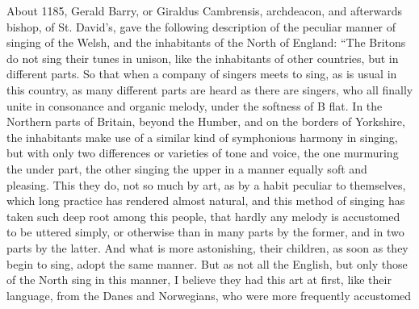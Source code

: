 About 1185, Gerald Barry, or Giraldus Cambrensis, 
\pagebreak
archdeacon, and afterwards
bishop, of St. David’s, gave the following description of the peculiar manner 
of singing of the Welsh, and the inhabitants of the North of England: “The
Britons do not sing their tunes in unison, like the inhabitants of other countries,
but in different parts. So that when a company of singers meets to sing, as is
usual in this country, as many different parts are heard as there are singers, who
all finally unite in consonance and organic melody, under the softness of B flat.
In the Northern parts of Britain, beyond the Humber, and on the borders of
Yorkshire, the inhabitants make use of a similar kind of symphonious harmony
in singing, but with only two differences or varieties of tone and voice, the one
murmuring the under part, the other singing the upper in a manner equally soft
and pleasing. This they do, not so much by art, as by a habit peculiar to themselves,
which long practice has rendered almost natural, and this method of singing
has taken such deep root among this people, that hardly any melody is accustomed
to be uttered simply, or otherwise than in many parts by the former, and in two
parts by the latter. And what is more astonishing, their children, as soon as they
begin to sing, adopt the same manner. But as not all the English, but only those
of the North sing in this manner, I believe they had this art at first, like their
language, from the Danes and Norwegians, who were more frequently accustomed
